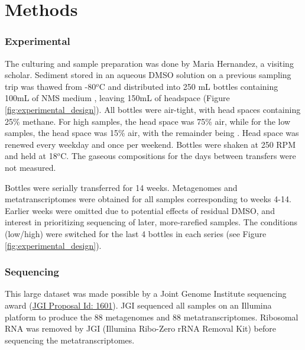 \section{Methods}

\subsubsection{Experimental}  %
The culturing and sample preparation was done by Maria Hernandez, a visiting scholar.
Sediment stored in an aqueous DMSO solution on a previous sampling trip was thawed from -80$^o$C and distributed into 250 mL bottles containing 100mL of NMS medium \cite{whittenbury1970, dedysh2014}, leaving 150mL of headspace (Figure \ref{fig:experimental_design}).
All bottles were air-tight, with head spaces containing 25\% methane.
For high  samples, the head space was 75\% air, while for the low  samples, the head space was 15\% air, with the remainder being .
Head space was renewed every weekday and once per weekend.
Bottles were shaken at 250 RPM and held at 18$^o$C.
The gaseous compositions for the days between transfers were not measured.

Bottles were serially transferred for 14 weeks.
Metagenomes and metatranscriptomes were obtained for all samples corresponding to weeks 4-14.
Earlier weeks were omitted due to potential effects of residual DMSO, and interest in prioritizing sequencing of later, more-rarefied samples.
The  conditions (low/high) were switched for the last 4 bottles in each series (see Figure \ref{fig:experimental_design}).

\subsubsection{Sequencing}  %
This large dataset was made possible by a Joint Genome Institute sequencing award (\href{http://genome.jgi.doe.gov/Metoximicrocosms/Metoximicrocosms.info.html}{JGI Proposal Id: 1601}).
JGI sequenced all samples on an Illumina platform to produce the 88 metagenomes and 88 metatranscriptomes.
Ribosomal RNA was removed by JGI (Illumina Ribo-Zero rRNA Removal Kit) before sequencing the metatranscriptomes.

